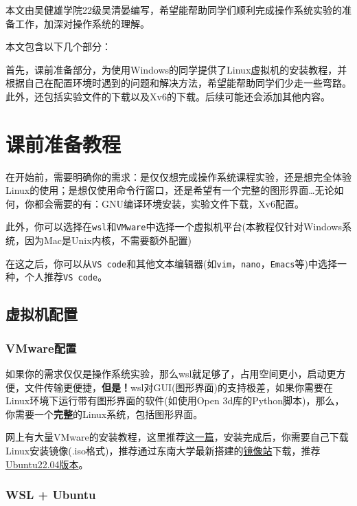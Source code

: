 \documentclass{article}
\author{}
\date{}
\begin{document}
本文由吴健雄学院22级吴清晏编写，希望能帮助同学们顺利完成操作系统实验的准备工作，加深对操作系统的理解。

本文包含以下几个部分：

首先，课前准备部分，为使用Windows的同学提供了Linux虚拟机的安装教程，并根据自己在配置环境时遇到的问题和解决方法，希望能帮助同学们少走一些弯路。此外，还包括实验文件的下载以及Xv6的下载。后续可能还会添加其他内容。

\section{课前准备教程}\label{ux8bfeux524dux51c6ux5907ux6559ux7a0b}

在开始前，需要明确你的需求：是仅仅想完成操作系统课程实验，还是想完全体验Linux的使用；是想仅使用命令行窗口，还是希望有一个完整的图形界面\ldots 无论如何，你都会需要的有：GNU编译环境安装，实验文件下载，Xv6配置。

此外，你可以选择在\texttt{wsl}和\texttt{VMware}中选择一个虚拟机平台(本教程仅针对Windows系统，因为Mac是Unix内核，不需要额外配置)

在这之后，你可以从\texttt{VS\ code}和其他文本编辑器(如\texttt{vim}，\texttt{nano}，\texttt{Emacs}等)中选择一种，个人推荐\texttt{VS\ code}。

\subsection{虚拟机配置}\label{ux865aux62dfux673aux914dux7f6e}

\subsubsection{VMware配置}\label{vmwareux914dux7f6e}

如果你的需求仅仅是操作系统实验，那么wsl就足够了，占用空间更小，启动更方便，文件传输更便捷，\textbf{但是！}wsl对GUI(图形界面)的支持极差，如果你需要在Linux环境下运行带有图形界面的软件(如使用Open
3d库的Python脚本)，那么，你需要一个\textbf{完整}的Linux系统，包括图形界面。

网上有大量VMware的安装教程，这里推荐\href{https://zhuanlan.zhihu.com/p/617093823}{这一篇}，安装完成后，你需要自己下载Linux安装镜像(.iso格式)，推荐通过东南大学最新搭建的\href{https://mirrors.seu.edu.cn/}{镜像站}下载，推荐\href{https://mirrors.seu.edu.cn/ubuntu-releases/22.04/ubuntu-22.04.4-desktop-amd64.iso}{Ubuntu22.04版本}。

\subsubsection{WSL + Ubuntu}\label{wsl--ubuntu}
\end{document}
